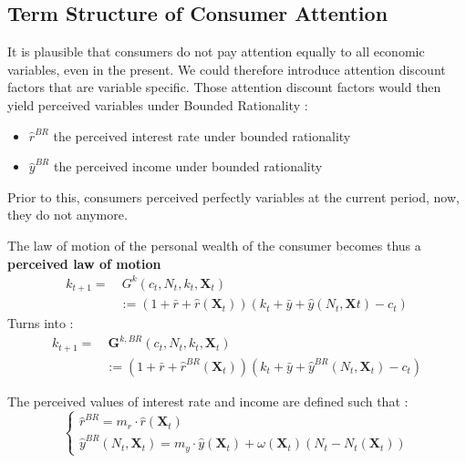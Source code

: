\documentclass{beamer}
\begin{document}
\subsection{Term Structure of Consumer Attention}
\begin{frame}{\subsecname}
    It is plausible that consumers do not pay attention equally to all economic variables, even in the present. 
    We could therefore introduce attention discount factors that are variable specific. 
    Those attention discount factors would then yield perceived variables under Bounded Rationality : 
    \begin{itemize}
        \item $\hat{r}^{BR}$ the perceived interest rate under bounded rationality
        \item $\hat{y}^{BR}$ the perceived income under bounded rationality
    \end{itemize}
    Prior to this, consumers perceived perfectly variables at the current period, now, they do not anymore.
\end{frame}
    
\begin{frame}{\subsecname}
    The law of motion of the personal wealth of the consumer becomes thus a \textbf{perceived law of motion}
    \begin{equation}\tag{6}
        \begin{split}
            k_{t+1}= &\ G^{k}(c_{t},N_{t}, k_{t}, \bm{X}_{t}) \\ 
            & := (1+\bar{r}+\hat{r}(\bm{X}_{t}))(k_{t}+\bar{y}+\hat{y}(N_{t},\bm{X}t)-c_{t})
        \end{split}
    \end{equation}
    Turns into :    
    \begin{equation} \tag{49}
        \begin{split}
            k_{t+1}= &\  \textbf{G}^{k,BR}(c_{t},N_{t},k_{t},\textbf{X}_{t}) \\
            & := (1+\bar{r}+\hat{r}^{BR}(\textbf{X}_t))(k_{t}+\bar{y}+\hat{y}^{BR}(N_{t},\textbf{X}_t)-c_{t})
        \end{split}
    \end{equation}
\end{frame}

\begin{frame}
    The perceived values of interest rate and income are defined such that :
    \begin{equation}\tag{50}
        \begin{cases}
            \hat{r}^{BR} = m_{r}\cdot\hat{r}(\textbf{X}_{t}) \\
            \hat{y}^{BR}(N_{t},\textbf{X}_{t}) = m_{y}\cdot\hat{y}(\textbf{X}_{t})+\omega(\textbf{X}_{t})(N_{t}-N_{t}(\textbf{X}_{t}))
        \end{cases}
    \end{equation}
\end{frame}
\end{document}
